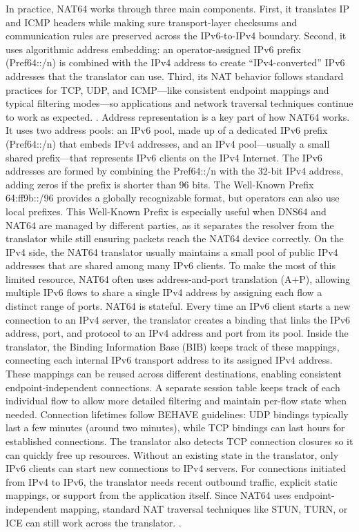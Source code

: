 In practice, NAT64 works through three main components. First, it translates IP and ICMP headers while making sure transport-layer checksums and communication rules are preserved across the IPv6-to-IPv4 boundary. Second, it uses algorithmic address embedding: an operator-assigned IPv6 prefix (Pref64::/n) is combined with the IPv4 address to create “IPv4-converted” IPv6 addresses that the translator can use. Third, its NAT behavior follows standard practices for TCP, UDP, and ICMP—like consistent endpoint mappings and typical filtering modes—so applications and network traversal techniques continue to work as expected. \cite{rfc6146,6231295}.
Address representation is a key part of how NAT64 works. It uses two address pools: an IPv6 pool, made up of a dedicated IPv6 prefix (Pref64::/n) that embeds IPv4 addresses, and an IPv4 pool—usually a small shared prefix—that represents IPv6 clients on the IPv4 Internet. The IPv6 addresses are formed by combining the Pref64::/n with the 32-bit IPv4 address, adding zeros if the prefix is shorter than 96 bits. The Well-Known Prefix 64:ff9b::/96 provides a globally recognizable format, but operators can also use local prefixes. This Well-Known Prefix is especially useful when DNS64 and NAT64 are managed by different parties, as it separates the resolver from the translator while still ensuring packets reach the NAT64 device correctly. On the IPv4 side, the NAT64 translator usually maintains a small pool of public IPv4 addresses that are shared among many IPv6 clients. To make the most of this limited resource, NAT64 often uses address-and-port translation (A+P), allowing multiple IPv6 flows to share a single IPv4 address by assigning each flow a distinct range of ports\cite{6231295,rfc6146}.
NAT64 is stateful. Every time an IPv6 client starts a new connection to an IPv4 server, the translator creates a binding that links the IPv6 address, port, and protocol to an IPv4 address and port from its pool. Inside the translator, the Binding Information Base (BIB) keeps track of these mappings, connecting each internal IPv6 transport address to its assigned IPv4 address. These mappings can be reused across different destinations, enabling consistent  endpoint-independent connections. A separate session table keeps track of each individual flow to allow more detailed filtering and maintain per-flow state when needed. Connection lifetimes follow BEHAVE guidelines: UDP bindings typically last a few minutes (around two minutes), while TCP bindings can last hours for established connections. The translator also detects TCP connection closures so it can quickly free up resources. Without an existing state in the translator, only IPv6 clients can start new connections to IPv4 servers. For connections initiated from IPv4 to IPv6, the translator needs recent outbound traffic, explicit static mappings, or support from the application itself. Since NAT64 uses endpoint-independent mapping, standard NAT traversal techniques like STUN, TURN, or ICE can still work across the translator. \cite{6231295,rfc6146}.
